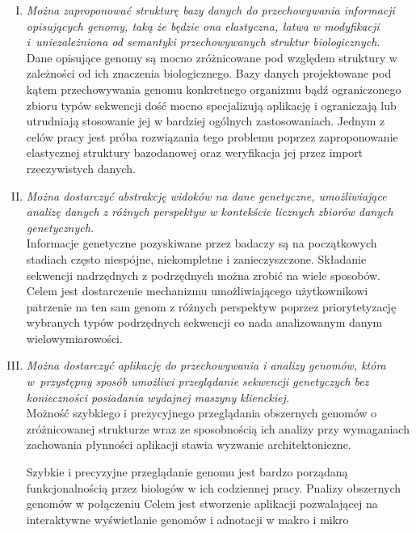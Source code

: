 \begin{enumerate}[I.]
	\item \textit{
		Można zaproponować strukturę bazy danych do przechowywania informacji opisujących genomy, taką że będzie ona elastyczna, łatwa w modyfikacji i~uniezależniona od semantyki przechowywanych struktur biologicznych.
		} \\
	\break
	Dane opisujące genomy są mocno zróżnicowane pod względem struktury w zależności od ich znaczenia biologicznego. Bazy danych projektowane pod kątem przechowywania genomu konkretnego organizmu bądź ograniczonego zbioru typów sekwencji dość mocno specjalizują aplikację i ograniczają lub utrudniają stosowanie jej w bardziej ogólnych zastosowaniach. Jednym z celów pracy jest próba rozwiązania tego problemu poprzez zaproponowanie elastycznej struktury bazodanowej oraz weryfikacja jej przez import rzeczywistych danych.\\
	
	\item \textit{
		Można dostarczyć abstrakcję widoków na dane genetyczne, umożliwiające analizę danych z różnych perspektyw w kontekście licznych zbiorów
		danych genetycznych.
		} \\
	\break
	Informacje genetyczne pozyskiwane przez badaczy są na początkowych stadiach często niespójne, niekompletne i zanieczyszczone. Składanie sekwencji nadrzędnych z podrzędnych można zrobić na wiele sposobów. Celem jest dostarczenie mechanizmu umożliwiającego użytkownikowi patrzenie na ten sam genom z różnych perspektyw poprzez priorytetyzację wybranych typów podrzędnych sekwencji co nada analizowanym danym wielowymiarowości.\\
	
	\item \textit{
		Można dostarczyć aplikację do przechowywania i analizy genomów, która w~przystępny sposób umożliwi przeglądanie sekwencji genetyczych bez konieczności posiadania wydajnej maszyny klienckiej. 
		} \\
		\break
	Możność szybkiego i prezycyjnego przeglądania obszernych genomów o zróżnicowanej strukturze wraz ze sposobnością ich analizy przy wymaganiach zachowania płynności aplikacji stawia wyzwanie architektoniczne.
	
	Szybkie i precyzyjne przeglądanie genomu jest bardzo porządaną funkcjonalnością przez biologów w ich codziennej pracy. Pnalizy obszernych genomów w połączeniu
	Celem jest stworzenie aplikacji pozwalającej na interaktywne wyświetlanie genomów i adnotacji w makro i mikro 
	
\end{enumerate}

